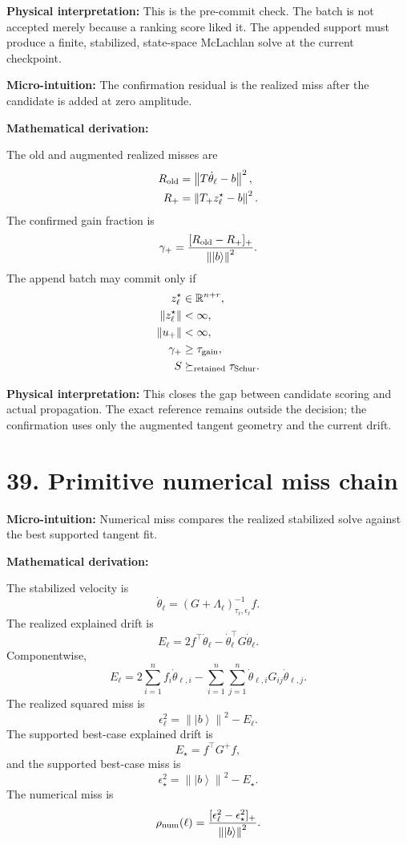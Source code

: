 \documentclass[10pt,twocolumn]{article}
\newcommand{\ket}[1]{\left|#1\right\rangle}
\newcommand{\norm}[1]{\left\lVert #1\right\rVert}
\newcommand{\R}{\mathbb R}
\newcommand{\micro}[1]{%
  \par\smallskip
  \noindent\textcolor{deepblue}{\textbf{Micro-intuition:}} #1
  \par\smallskip}
\newcommand{\deriv}{%
  \par\noindent\textcolor{deepviolet}{\textbf{Mathematical derivation:}}\par\vspace{-1mm}}
\newcommand{\phys}[1]{%
  \par\smallskip
  \noindent\textcolor{deepgreen}{\textbf{Physical interpretation:}} #1
  \par\smallskip}
\begin{document}
\phys{This is the pre-commit check. The batch is not accepted merely because a
ranking score liked it. The appended support must produce a finite, stabilized,
state-space McLachlan solve at the current checkpoint.}

\micro{The confirmation residual is the realized miss after the candidate is
added at zero amplitude.}

\deriv
The old and augmented realized misses are
\[
\begin{aligned}
R_{\rm old}
&=\norm{T\dot\theta_\ell-b}^2,\\
R_+
&=\norm{T_+z^\star_\ell-b}^2.
\end{aligned}
\]
The confirmed gain fraction is
\[
\gamma_+
=
\frac{[R_{\rm old}-R_+]_+}{\norm{\ket b}^2}.
\]
The append batch may commit only if
\[
\begin{aligned}
z^\star_\ell&\in\R^{n+r},\\
\norm{z^\star_\ell}&<\infty,\\
\norm{u_+}&<\infty,\\
\gamma_+&\ge\tau_{\rm gain},\\
S&\succeq_{\rm retained}\tau_{\rm Schur}.
\end{aligned}
\]

\phys{This closes the gap between candidate scoring and actual propagation.
The exact reference remains outside the decision; the confirmation uses only
the augmented tangent geometry and the current drift.}

\section*{39. Primitive numerical miss chain}

\micro{Numerical miss compares the realized stabilized solve against the best
supported tangent fit.}

\deriv
The stabilized velocity is
\[
\dot\theta_\ell
=
(G+\Lambda_\ell)_{\tau_\ell,\epsilon_\ell}^{-1}f.
\]
The realized explained drift is
\[
E_\ell
=
2f^\top\dot\theta_\ell
-
\dot\theta_\ell^\top G\dot\theta_\ell.
\]
Componentwise,
\[
E_\ell
=
2\sum_{i=1}^{n}f_i\dot\theta_{\ell,i}
-
\sum_{i=1}^{n}\sum_{j=1}^{n}
\dot\theta_{\ell,i}G_{ij}\dot\theta_{\ell,j}.
\]
The realized squared miss is
\[
\epsilon_\ell^2
=
\norm{\ket b}^2-E_\ell.
\]
The supported best-case explained drift is
\[
E_\star
=
f^\top G^+f,
\]
and the supported best-case miss is
\[
\epsilon_\star^2
=
\norm{\ket b}^2-E_\star.
\]
The numerical miss is
\[
\rho_{\rm num}(\ell)
=
\frac{[\epsilon_\ell^2-\epsilon_\star^2]_+}{\norm{\ket b}^2}.
\]
\end{document}
